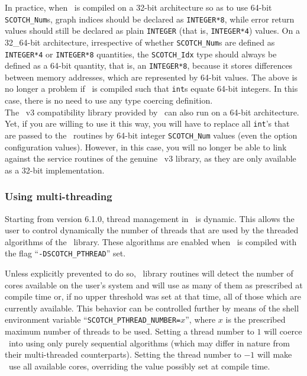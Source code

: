 In practice, when \scotch\ is compiled on a 32-bit architecture so as
to use 64-bit {\tt SCOTCH\_\lbt Num}s, graph indices should be
declared as {\tt INTEGER*8}, while error return values
should still be declared as plain {\tt INTEGER} (that is,
{\tt INTEGER*4}) values. On a 32\_64-bit architecture, irrespective of
whether {\tt SCOTCH\_\lbt Num}s are defined as {\tt INTEGER*4}
or {\tt INTEGER*8} quantities, the {\tt SCOTCH\_\lbt Idx} type
should always be defined as a 64-bit quantity, that is, an
{\tt INTEGER*8}, because it stores differences between memory
addresses, which are represented by 64-bit values.
The above is no longer a problem if \scotch\ is compiled such that
{\tt int}s equate 64-bit integers. In this case, there is no need to
use any type coercing definition.
\\

The \metis\ v3 compatibility library provided by \scotch\ can also
run on a 64-bit architecture. Yet, if you are willing to use it this
way, you will have to replace all {\tt int}'s that are passed to the
\metis\ routines by 64-bit integer {\tt SCOTCH\_\lbt Num} values (even
the option configuration values). However, in this case, you will no
longer be able to link against the service routines of the genuine
\metis\ v3 library, as they are only available as a 32-bit
implementation.

\subsubsection{Using multi-threading}
\label{sec-lib-multithread}

Starting from version \textsc{6.1.0}, thread management in \scotch\ is
dynamic. This allows the user to control dynamically the number of
threads that are used by the threaded algorithms of the
\libscotch\ library. These algorithms are enabled when \scotch\ is
compiled with the flag ``\texttt{-DSCOTCH\_\lbt PTHREAD}'' set.

Unless explicitly prevented to do so, \libscotch\ library routines
will detect the number of cores available on the user's system and
will use as many of them as prescribed at compile time or, if no upper
threshold was set at that time, all of those which are currently
available. This behavior can be controlled further by means of the
shell environment variable
``\texttt{SCOTCH\_\lbt PTHREAD\_\lbt NUMBER=}$x$'', where $x$ is the
prescribed maximum number of threads to be used. Setting a thread
number to $1$ will coerce \scotch\ into using only purely sequential
algorithms (which may differ in nature from their multi-threaded
counterparts). Setting the thread number to $-1$ will make
\scotch\ use all available cores, overriding the value possibly set at
compile time.

